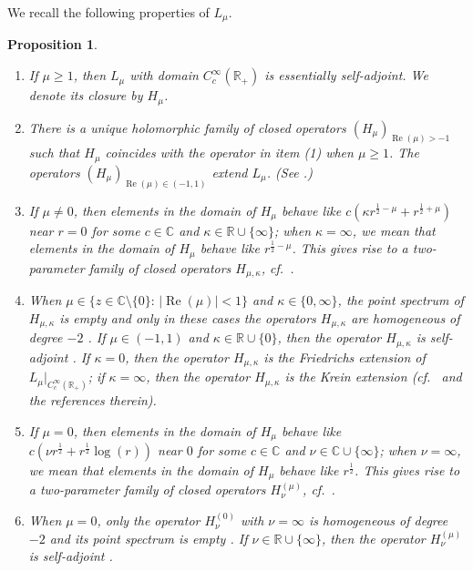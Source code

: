 \documentclass[12pt,reqno,a4paper]{amsart}
\newtheorem{proposition}[theorem]{Proposition}
\theoremstyle{definition}
\theoremstyle{remark}
\numberwithin{equation}{section}
\newcommand{\1}{\mathbbm{1}}
\newcommand{\C}{\mathbb{C}}
\newcommand{\R}{\mathbb{R}}
\DeclareMathOperator{\re}{Re}
\begin{document}
We recall the following properties of $L_\mu$.
\begin{proposition}
  \label{besseloperatorproperties}
  \begin{enumerate}
  \item If $\mu\geq1$, then $L_\mu$ with domain $C_c^\infty(\R_+)$ is essentially self-adjoint. We denote its closure by $H_\mu$.
    
  \item There is a unique holomorphic family of closed operators $(H_\mu)_{\re(\mu)>-1}$ such that $H_\mu$ coincides with the operator in item (1) when $\mu\geq1$.
    The operators $(H_\mu)_{\re(\mu)\in(-1,1)}$ extend $L_\mu$. (See \cite[Theorem~1.1]{Bruneauetal2011}.)
    
  \item If $\mu\neq0$, then elements in the domain of $H_\mu$ behave like $c(\kappa r^{\frac12-\mu}+r^{\frac12+\mu})$ near $r=0$ for some $c\in\C$ and $\kappa\in\R\cup\{\infty\}$; when $\kappa=\infty$, we mean that elements in the domain of $H_\mu$ behave like $r^{\frac12-\mu}$. This gives rise to a two-parameter family of closed operators $H_{\mu,\kappa}$, cf.~\cite[p.~876--878]{DerezinskiRichard2017}.
    
  \item When $\mu\in\{z\in\C\setminus\{0\}:\,|\re(\mu)|<1\}$ and $\kappa\in\{0,\infty\}$, the point spectrum of $H_{\mu,\kappa}$ is empty \cite[Theorem~5.2]{DerezinskiRichard2017} and only in these cases the operators $H_{\mu,\kappa}$ are homogeneous of degree $-2$ \cite[Proposition~2.2]{DerezinskiRichard2017}.
    If $\mu\in(-1,1)$ and $\kappa\in\R\cup\{0\}$, then the operator $H_{\mu,\kappa}$ is self-adjoint \cite[Corollary~2.4]{DerezinskiRichard2017}.
    If $\kappa=0$, then the operator $H_{\mu,\kappa}$ is the Friedrichs extension of $L_\mu\big|_{C_c^\infty(\R_+)}$; if $\kappa=\infty$, then the operator $H_{\mu,\kappa}$ is the Krein extension (cf.~\cite[p.~7]{DerezinskiGrocholski2020} and the references therein).

  \item If $\mu=0$, then elements in the domain of $H_\mu$ behave like $c(\nu r^{\frac12}+r^{\frac12}\log(r))$ near $0$ for some $c\in\C$ and $\nu\in\C\cup\{\infty\}$; when $\nu=\infty$, we mean that elements in the domain of $H_\mu$ behave like $r^{\frac12}$. This gives rise to a two-parameter family of closed operators $H_\nu^{(\mu)}$, cf.~\cite[p.~876--878]{DerezinskiRichard2017}.
    
  \item When $\mu=0$, only the operator $H_\nu^{(0)}$ with $\nu=\infty$ is homogeneous of degree $-2$ and its point spectrum is empty \cite[Proposition~2.2, Theorem~5.2]{DerezinskiRichard2017}. If $\nu\in\R\cup\{\infty\}$, then the operator $H_\nu^{(\mu)}$ is self-adjoint \cite[Corollary~2.4]{DerezinskiRichard2017}.
  \end{enumerate}
\end{proposition}
\end{document}
